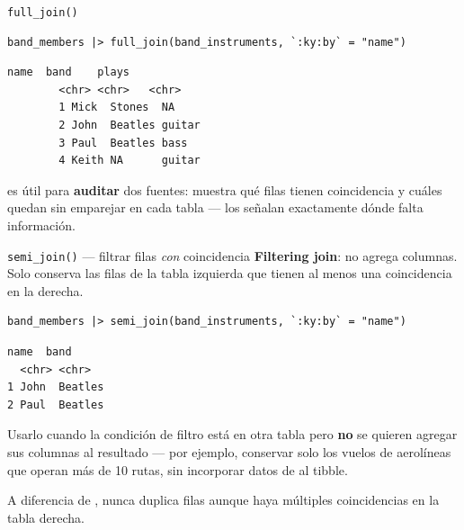 \documentclass[8pt]{beamer}
\begin{document}
	\begin{frame}[fragile]{\texttt{full\_join()}}
	\begin{lstlisting}[style=RScript]
		band_members |> full_join(band_instruments, `:ky:by` = "name")
\end{lstlisting}
	\begin{lstlisting}[style=RConsole]
		name  band    plays
		<chr> <chr>   <chr>
		1 Mick  Stones  NA
		2 John  Beatles guitar
		3 Paul  Beatles bass
		4 Keith NA      guitar
\end{lstlisting}
	
	\begin{exampleblock}{}
		 es útil para \textbf{auditar} dos fuentes: muestra qué filas tienen coincidencia y cuáles quedan sin emparejar en cada tabla — los  señalan exactamente dónde falta información.
	\end{exampleblock}
\end{frame}




	\begin{frame}[fragile]{\texttt{semi\_join()} — filtrar filas \emph{con} coincidencia}
		\textbf{Filtering join}: no agrega columnas. Solo conserva las filas de la tabla izquierda que tienen al menos una coincidencia en la derecha.

		\begin{lstlisting}[style=RScript]
band_members |> semi_join(band_instruments, `:ky:by` = "name")
\end{lstlisting}
		\begin{lstlisting}[style=RConsole]
  name  band
  <chr> <chr>
1 John  Beatles
2 Paul  Beatles
\end{lstlisting}

		\begin{exampleblock}{}
			Usarlo cuando la condición de filtro está en otra tabla pero \textbf{no} se quieren agregar sus columnas al resultado — por ejemplo, conservar solo los vuelos de aerolíneas que operan más de 10 rutas, sin incorporar datos de  al tibble.
		\end{exampleblock}

		\begin{block}{}
			A diferencia de ,  nunca duplica filas aunque haya múltiples coincidencias en la tabla derecha.
		\end{block}
	\end{frame}
\end{document}
